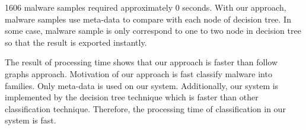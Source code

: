 1606 malware samples required approximately 0 seconds. With our approach, malware samples use meta-data to compare with each node of decision tree. In some case, malware sample is only correspond to one to two node in decision tree so that the result is exported instantly. 

The result of processing time shows that our approach is faster than follow graphs approach. Motivation of our approach is fast classify malware into families. Only meta-data is used on our system. Additionally, our system is implemented by the decision tree technique which is faster than other classification technique. Therefore, the processing time of classification in our system is fast.    

